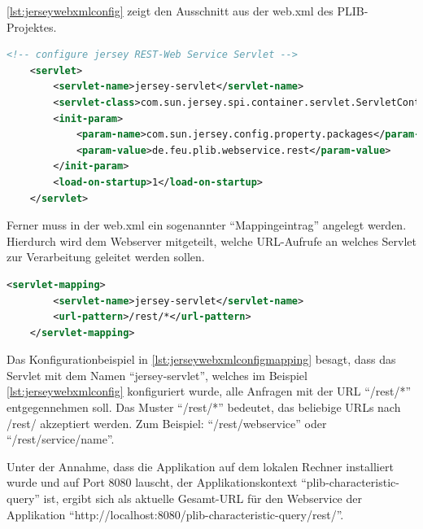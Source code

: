 \autoref{lst:jerseywebxmlconfig} zeigt den Ausschnitt aus der web.xml des \gls{PLIB}-Projektes. 

 \begin{lstlisting}[caption=Jersey Servlet Konfiguration in web.xml, language=XML, label=lst:jerseywebxmlconfig]
 <!-- configure jersey REST-Web Service Servlet -->
    <servlet>
        <servlet-name>jersey-servlet</servlet-name>
        <servlet-class>com.sun.jersey.spi.container.servlet.ServletContainer</servlet-class>
        <init-param>
            <param-name>com.sun.jersey.config.property.packages</param-name>
            <param-value>de.feu.plib.webservice.rest</param-value>
        </init-param>
        <load-on-startup>1</load-on-startup>
    </servlet>
 \end{lstlisting}   
 
Ferner muss in der web.xml ein sogenannter \enquote{Mappingeintrag} angelegt werden. Hierdurch wird dem Webserver mitgeteilt, welche \gls{URL}-Aufrufe an welches \gls{Servlet} zur Verarbeitung geleitet werden sollen. 
 
  \begin{lstlisting}[caption=Jersey Servlet Mappingkonfiguration in web.xml, language=XML, label=lst:jerseywebxmlconfigmapping]
    <servlet-mapping>
        <servlet-name>jersey-servlet</servlet-name>
        <url-pattern>/rest/*</url-pattern>
    </servlet-mapping>
 \end{lstlisting}  
 
Das Konfigurationbeispiel in \autoref{lst:jerseywebxmlconfigmapping}  besagt, dass das \gls{Servlet} mit dem Namen \enquote{jersey-servlet}, welches im Beispiel \autoref{lst:jerseywebxmlconfig}  konfiguriert wurde, alle Anfragen mit der URL \enquote{/rest/*} entgegennehmen soll. Das Muster \enquote{/rest/*} bedeutet, das beliebige URLs nach /rest/ akzeptiert werden. Zum Beispiel: \enquote{/rest/webservice} oder \enquote{/rest/service/name}.

Unter der Annahme, dass die Applikation auf dem lokalen Rechner installiert wurde und auf Port 8080 lauscht, der \gls{Applikationskontext} \enquote{plib-characteristic-query} ist, ergibt sich als aktuelle Gesamt-URL für den \gls{Webservice} der Applikation \enquote{http://localhost:8080/plib-characteristic-query/rest/}.
 

